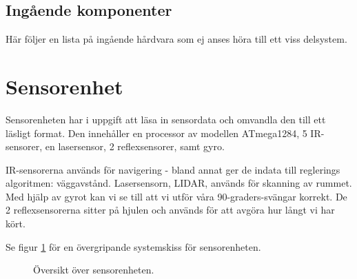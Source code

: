 \documentclass[a4paper,11pt]{article}
\begin{document}
\subsection{Ingående komponenter}
Här följer en lista på ingående hårdvara som ej anses höra till ett viss delsystem.

\begin{HardwareList}
\end{HardwareList}

\clearpage
\section{Sensorenhet} \label{sec:system1}
Sensorenheten har i uppgift att läsa in sensordata och omvandla den till ett läsligt format. Den innehåller en processor av modellen ATmega1284, 5 IR-sensorer, en lasersensor, 2 reflexsensorer, samt gyro.

IR-sensorerna används för navigering - bland annat ger de indata till reglerings algoritmen: väggavstånd. Lasersensorn, LIDAR, används för skanning av rummet. Med hjälp av gyrot kan vi se till att vi utför våra 90-graders-svängar korrekt. De 2 reflexsensorerna sitter på hjulen och används för att avgöra hur långt vi har kört.

Se figur \ref{fig:unitSensor} för en övergripande systemskiss för sensorenheten.

\begin{figure}[h!]
	\caption{Översikt över sensorenheten.}
	\label{fig:unitSensor}
\end{figure}
\end{document}
